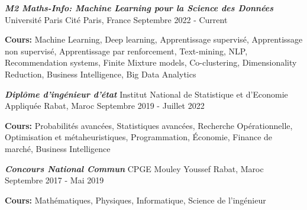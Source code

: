 

\begin{cventries}

  \cventry
    {\textbf{\textit{M2 Maths-Info: Machine Learning pour la Science des Données}}} %
    {Université Paris Cité} %
    {Paris, France} %
    {Septembre 2022 - Current} %
    {
      \begin{cvitems} %
        \item {\textbf{Cours:} Machine Learning, Deep learning, Apprentissage supervisé, Apprentissage non supervisé, Apprentissage par renforcement, Text-mining, NLP, Recommendation systems, Finite Mixture models, Co-clustering, Dimensionality Reduction, Business Intelligence, Big Data Analytics}
      \end{cvitems}
    }
    
  \cventry
    {\textbf{\textit{Diplôme d'ingénieur d'état}}} %
    {Institut National de Statistique et d'Economie Appliquée} %
    {Rabat, Maroc} %
    {Septembre 2019 - Juillet 2022} %
    {
      \begin{cvitems} %
        \item {\textbf{Cours:} Probabilités avancées, Statistiques avancées, Recherche Opérationnelle, Optimisation et métaheuristiques, Programmation, Économie, Finance de marché, Business Intelligence}
      \end{cvitems}
    }
    
  \cventry
    {\textbf{\textit{Concours National Commun}}} %
    {CPGE Mouley Youssef} %
    {Rabat, Maroc} %
    {Septembre 2017 - Mai 2019} %
    {
      \begin{cvitems} %
        \item {\textbf{Cours:} Mathématiques, Physiques, Informatique, Science de l'ingénieur }
      \end{cvitems}
    }
\end{cventries}
